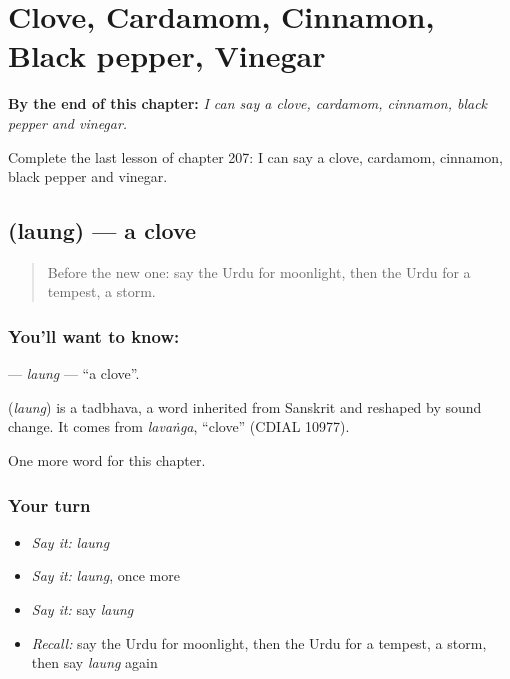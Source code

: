 
\chapter{Clove, Cardamom, Cinnamon, Black pepper, Vinegar}
\label{ch:ur-clove-cardamom-cinnamon-black-pepper-vinegar}

\begin{chapteropening}
\textbf{By the end of this chapter:} \emph{I can say a clove, cardamom, cinnamon, black pepper and vinegar.}

Complete the last lesson of chapter 207: I can say a clove, cardamom, cinnamon, black pepper and vinegar.
\end{chapteropening}

\section[\texorpdfstring{\ur{لونگ} (laung)}{لونگ (laung)}]{ (laung) — a clove}

\label{lesson:UR-C207-laung}



\begin{quote}
Before the new one: say the Urdu for moonlight, then the Urdu for a tempest, a storm.
\end{quote}

\subsection*{You'll want to know: }
\textbf{} — \emph{laung} — \textquotedblleft{}a clove\textquotedblright{}.

\begin{cousinweb}
\textbf{} (\emph{laung}) is a tadbhava, a word inherited from Sanskrit and reshaped by sound change. It comes from \emph{lavaṅga}, \textquotedblleft{}clove\textquotedblright{} (CDIAL 10977).
\end{cousinweb}

\begin{grammarlens}[title={What you've built}]
One more word for this chapter.
\end{grammarlens}

\subsection*{Your turn}
\begin{itemize}
\raggedright
  \item \emph{Say it:} \emph{laung}
  \item \emph{Say it:} \emph{laung}, once more
  \item \emph{Say it:} say \emph{laung}
  \item \emph{Recall:} say the Urdu for moonlight, then the Urdu for a tempest, a storm, then say \emph{laung} again
\end{itemize}


